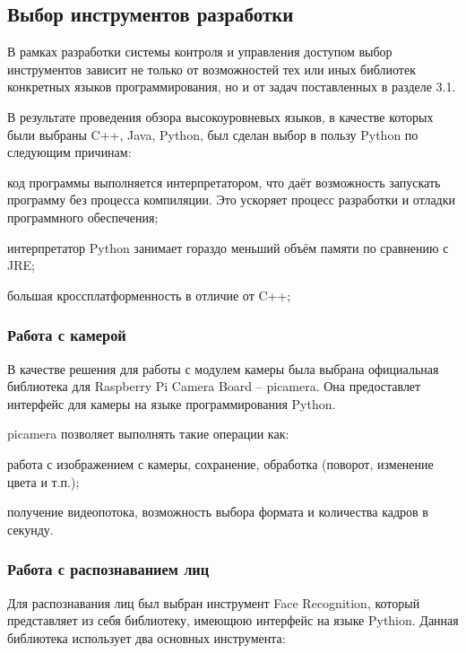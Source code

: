 \subsection{Выбор инструментов разработки}

В рамках разработки системы контроля и управления доступом выбор инструментов зависит не только от возможностей тех или иных библиотек конкретных языков программирования, но и от задач поставленных в разделе 3.1.

В результате проведения обзора высокоуровневых языков, в качестве которых были выбраны C++, Java, Python, был сделан выбор в пользу Python по следующим причинам:

\begin{itemize*}
\item код программы выполняется интерпретатором, что даёт возможность запускать программу без процесса компиляции. Это ускоряет процесс разработки и отладки программного обеспечения;
\item интерпретатор Python занимает гораздо меньший объём памяти по сравнению с JRE;
\item большая кроссплатформенность в отличие от C++;
\end{itemize*}

\subsubsection{Работа с камерой}

В качестве решения для работы с модулем камеры была выбрана официальная библиотека для Raspberry Pi Camera Board -- picamera. Она предоставлет интерфейс для камеры на языке программирования Python.

picamera позволяет выполнять такие операции как:

\begin{itemize*}
\item работа с изображением с камеры, сохранение, обработка (поворот, изменение цвета и т.п.);
\item получение видеопотока, возможность выбора формата и количества кадров в секунду.
\end{itemize*}

\subsubsection{Работа с распознаванием лиц}

Для распознавания лиц был выбран инструмент Face Recognition, который представляет из себя библиотеку, имеющюю интерфейс на языке Pythion. Данная библиотека использует два основных инструмента:

